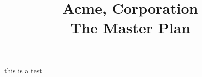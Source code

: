 \documentclass{article}
\title{%
    Acme, Corporation \\
    \large The Master Plan \\}
\begin{document}
\maketitle




this is a test












\end{document}
